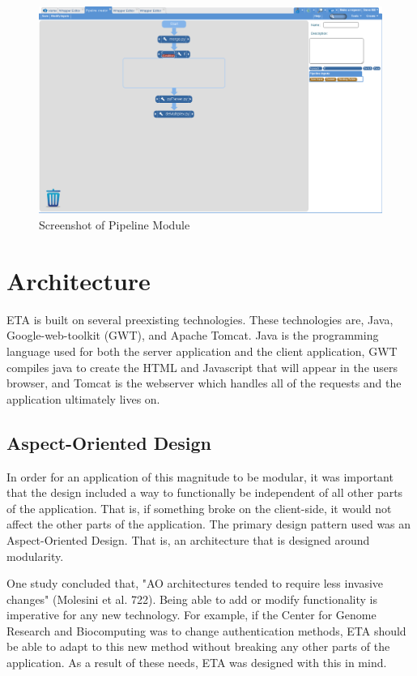 \documentclass[a4paper,12pt]{article}
\begin{document}
 \begin{figure}
\includegraphics[width=1\textwidth]{pipeline.png}
\caption{Screenshot of Pipeline Module}
\label{fig:pipeline}
\end{figure}


 
\section{Architecture}

ETA is built on several preexisting technologies. These technologies are, Java, Google-web-toolkit (GWT), and Apache Tomcat. Java is the programming language used for both the server application and the client application, GWT compiles java  to create the HTML and Javascript that will appear in the users browser, and Tomcat is the webserver which handles all of the requests and the application ultimately lives on.

\subsection{Aspect-Oriented Design}
In order for an application of this magnitude to be modular, it was important that the design included a way to functionally be independent of all other parts of the application. That is, if something broke on the client-side, it would not affect the other parts of the application. The primary design pattern used was an Aspect-Oriented Design. That is, an architecture that is designed around modularity. 

One study concluded that, "AO architectures tended to require less invasive changes" (Molesini et al. 722). Being able to add or modify functionality is imperative for any new technology. For example, if the Center for Genome Research and Biocomputing was to change authentication methods, ETA should be able to adapt to this new method without breaking any other parts of the application. As a result of these needs, ETA was designed with this in mind.
\end{document}

